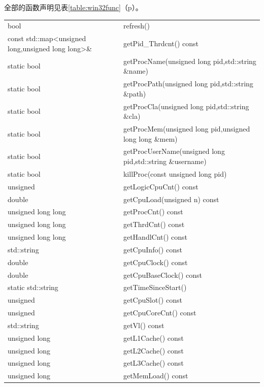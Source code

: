 \documentclass{beamer}
\newcommand\myref[1]{\ref{#1}（p\pageref{#1}）}
\begin{document}
\begin{frame}
    
全部的函数声明见表\myref{table:win32func}。

\begin{table}[htbp]
    \ttfamily
    \centering
    \begin{tabular}{>{\raggedleft\arraybackslash}p{18em}p{24em}}
        \hline
        bool & refresh() \\
        const std::map<unsigned long,unsigned long long>\& & getPid\_Thrdcnt() const \\
        static bool & getProcName(unsigned long pid,std::string \&name) \\
        static bool & getProcPath(unsigned long pid,std::string \&path) \\
        static bool & getProcCla(unsigned long pid,std::string \&cla) \\
        static bool & getProcMem(unsigned long pid,unsigned long long \&mem) \\
        static bool & getProcUserName(unsigned long pid,std::string \&username) \\
        static bool & killProc(const unsigned long pid) \\
        unsigned & getLogicCpuCnt() const \\
        double & getCpuLoad(unsigned n) const \\
        unsigned long long & getProcCnt() const \\
        unsigned long long & getThrdCnt() const \\
        unsigned long long & getHandlCnt() const \\
        std::string & getCpuInfo() const \\
        double & getCpuClock() const \\
        double & getCpuBaseClock() const \\
        static std::string & getTimeSinceStart() \\
        unsigned & getCpuSlot() const \\
        unsigned & getCpuCoreCnt() const \\
        std::string & getVl() const \\
        unsigned long & getL1Cache() const \\
        unsigned long & getL2Cache() const \\
        unsigned long & getL3Cache() const \\
        unsigned long & getMemLoad() const \\

\end{tabular}
\end{table}
\end{frame}
\end{document}
